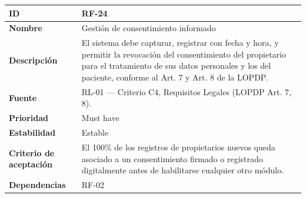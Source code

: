 {\def\LTcaptype{none} %
\begin{longtable}[]{@{}
  >{\raggedright\arraybackslash}p{}
  >{\raggedright\arraybackslash}p{}@{}}
\toprule\noalign{}
\begin{minipage}[b]{\linewidth}\raggedright
\textbf{ID}
\end{minipage} & \begin{minipage}[b]{\linewidth}\raggedright
RF-24
\end{minipage} \\
\midrule\noalign{}
\endhead
\bottomrule\noalign{}
\endlastfoot
\textbf{Nombre} & \begin{minipage}[t]{\linewidth}\raggedright
Gestión de consentimiento informado
\end{minipage} \\
\textbf{Descripción} & \begin{minipage}[t]{\linewidth}\raggedright
El sistema debe capturar, registrar con fecha y hora, y permitir la
revocación del consentimiento del propietario para el tratamiento de sus
datos personales y los del paciente, conforme al Art. 7 y Art. 8 de la
LOPDP.
\end{minipage} \\
\textbf{Fuente} & \begin{minipage}[t]{\linewidth}\raggedright
RL-01 --- Criterio C4, Requisitos Legales (LOPDP Art. 7, 8).
\end{minipage} \\
\textbf{Prioridad} & \begin{minipage}[t]{\linewidth}\raggedright
Must have
\end{minipage} \\
\textbf{Estabilidad} & \begin{minipage}[t]{\linewidth}\raggedright
Estable
\end{minipage} \\
\textbf{Criterio de aceptación} &
\begin{minipage}[t]{\linewidth}\raggedright
El 100\% de los registros de propietarios nuevos queda asociado a un
consentimiento firmado o registrado digitalmente antes de habilitarse
cualquier otro módulo.
\end{minipage} \\
\textbf{Dependencias} & \begin{minipage}[t]{\linewidth}\raggedright
RF-02
\end{minipage} \\
\end{longtable}
}


